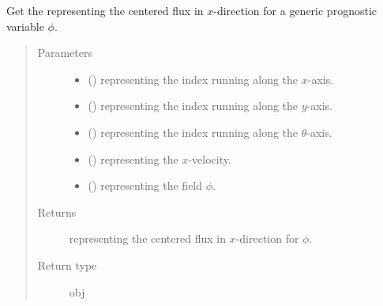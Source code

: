 \documentclass[letterpaper,10pt,english]{sphinxmanual}
\begin{document}
\begin{fulllineitems}
\begin{fulllineitems}
\label{\detokenize{api:dycore.flux_isentropic_centered.FluxIsentropicCentered._get_centered_flux_x}}
Get the  representing the centered flux in \(x\)-direction for a generic
prognostic variable \(\phi\).
\begin{quote}\begin{description}
\item[{Parameters}] \leavevmode\begin{itemize}
\item {} 
 () \textendash{}  representing the index running along the \(x\)-axis.

\item {} 
 () \textendash{}  representing the index running along the \(y\)-axis.

\item {} 
 () \textendash{}  representing the index running along the \(\theta\)-axis.

\item {} 
 () \textendash{}  representing the \(x\)-velocity.

\item {} 
 () \textendash{}  representing the field \(\phi\).

\end{itemize}

\item[{Returns}] \leavevmode
{} representing the centered flux in \(x\)-direction for \(\phi\).

\item[{Return type}] \leavevmode
obj

\end{description}\end{quote}

\end{fulllineitems}



\end{fulllineitems}
\end{document}
